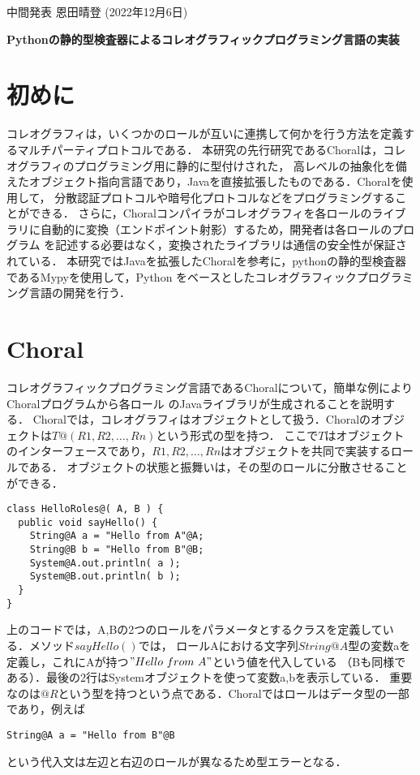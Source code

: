 \documentclass[11pt]{jarticle}
\begin{document}
\begin{flushleft}
  中間発表\hspace{\fill}
  恩田晴登 (2022年12月6日)
\end{flushleft}
\begin{center}
{\Large\bf Pythonの静的型検査器によるコレオグラフィックプログラミング言語の実装}
\end{center}

\section{初めに}
コレオグラフィは，いくつかのロールが互いに連携して何かを行う方法を定義するマルチパーティプロトコルである．
本研究の先行研究であるChoral\cite{Choral}は，コレオグラフィのプログラミング用に静的に型付けされた，
高レベルの抽象化を備えたオブジェクト指向言語であり，Javaを直接拡張したものである．Choralを使用して，
分散認証プロトコルや暗号化プロトコルなどをプログラミングすることができる．
さらに，Choralコンパイラがコレオグラフィを各ロールのライブラリに自動的に変換（エンドポイント射影）するため，開発者は各ロールのプログラム
を記述する必要はなく，変換されたライブラリは通信の安全性が保証されている．
本研究ではJavaを拡張したChoralを参考に，pythonの静的型検査器であるMypy\cite{mypy}を使用して，Python
をベースとしたコレオグラフィックプログラミング言語の開発を行う．

\section{Choral}
コレオグラフィックプログラミング言語であるChoralについて，簡単な例によりChoralプログラムから各ロール
のJavaライブラリが生成されることを説明する\cite{choreography}．
Choralでは，コレオグラフィはオブジェクトとして扱う．Choralのオブジェクトは$T@(R1,R2, \dots ,Rn)$という形式の型を持つ．
ここで$T$はオブジェクトのインターフェースであり，$R1,R2, \dots ,Rn$はオブジェクトを共同で実装するロールである．
オブジェクトの状態と振舞いは，その型のロールに分散させることができる．
\begin{lstlisting}[caption = HelloRoles(Choral program)]
class HelloRoles@( A, B ) {
  public void sayHello() {
    String@A a = "Hello from A"@A;
    String@B b = "Hello from B"@B;
    System@A.out.println( a );
    System@B.out.println( b );
  }
}
\end{lstlisting}
上のコードでは，A,Bの2つのロールをパラメータとするクラスを定義している．メソッド$sayHello()$では，
ロールAにおける文字列$String@A$型の変数aを定義し，これにAが持つ$"Hello~from~A"$という値を代入している
（Bも同様である）．最後の2行はSystemオブジェクトを使って変数a,bを表示している．
重要なのは$@R$という型を持つという点である．Choralではロールはデータ型の一部であり，例えば
\begin{lstlisting}
String@A a = "Hello from B"@B
\end{lstlisting}
という代入文は左辺と右辺のロールが異なるため型エラーとなる．
\end{document}

